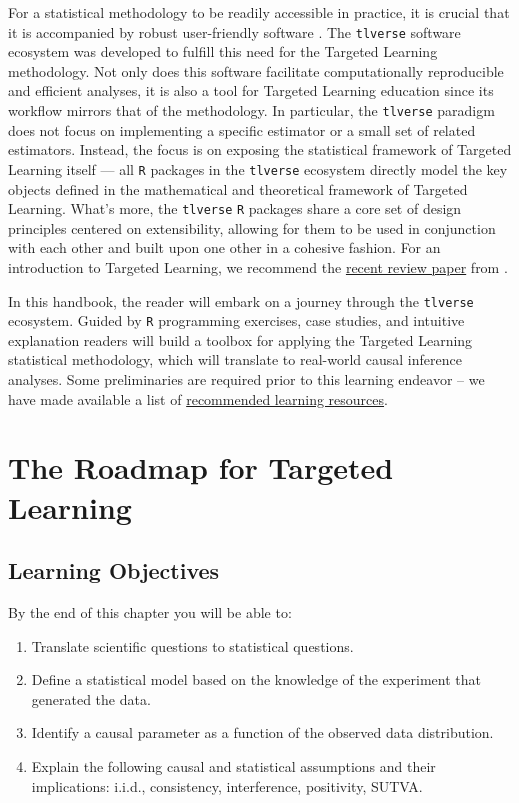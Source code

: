 \documentclass[12pt, krantz2,]{book}
\providecommand{\tightlist}{%
  \setlength{\itemsep}{0pt}\setlength{\parskip}{0pt}}
\theoremstyle{definition}
\theoremstyle{definition}
\theoremstyle{definition}
\newcommand{\1}{\mathbbm{1}}
\begin{document}
For a statistical methodology to be readily accessible in practice, it is
crucial that it is accompanied by robust user-friendly software
\citep{pullenayegum2016knowledge, stromberg2004write}. The \texttt{tlverse} software
ecosystem was developed to fulfill this need for the Targeted Learning
methodology. Not only does this software facilitate computationally reproducible
and efficient analyses, it is also a tool for Targeted Learning education since
its workflow mirrors that of the methodology. In particular, the \texttt{tlverse}
paradigm does not focus on implementing a specific estimator or a small set of
related estimators. Instead, the focus is on exposing the statistical framework
of Targeted Learning itself --- all \texttt{R} packages in the \texttt{tlverse} ecosystem
directly model the key objects defined in the mathematical and theoretical
framework of Targeted Learning. What's more, the \texttt{tlverse} \texttt{R} packages share a
core set of design principles centered on extensibility, allowing for them to be
used in conjunction with each other and built upon one other in a cohesive
fashion. For an introduction to Targeted Learning, we recommend the \href{https://arxiv.org/abs/2006.07333}{recent
review paper} from \citet{coyle2021targeted}.

In this handbook, the reader will embark on a journey through the \texttt{tlverse}
ecosystem. Guided by \texttt{R} programming exercises, case studies, and
intuitive explanation readers will build a toolbox for applying the Targeted
Learning statistical methodology, which will translate to real-world causal
inference analyses. Some preliminaries are required prior to this learning
endeavor -- we have made available a list of \protect\hyperlink{learn}{recommended learning
resources}.

\hypertarget{intro}{%
\chapter{The Roadmap for Targeted Learning}\label{intro}}

\hypertarget{learning-objectives}{%
\section*{Learning Objectives}\label{learning-objectives}}


By the end of this chapter you will be able to:

\begin{enumerate}
\def\labelenumi{\arabic{enumi}.}
\tightlist
\item
  Translate scientific questions to statistical questions.
\item
  Define a statistical model based on the knowledge of the experiment that
  generated the data.
\item
  Identify a causal parameter as a function of the observed data distribution.
\item
  Explain the following causal and statistical assumptions and their
  implications: i.i.d., consistency, interference, positivity, SUTVA.
\end{enumerate}
\end{document}
